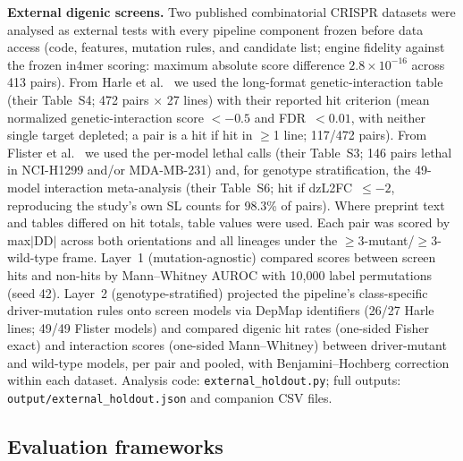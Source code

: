 \documentclass[11pt,a4paper]{article}
\begin{document}
\textbf{External digenic screens.} Two published combinatorial CRISPR datasets were analysed as external tests with every pipeline component frozen before data access (code, features, mutation rules, and candidate list; engine fidelity against the frozen in4mer scoring: maximum absolute score difference $2.8\times10^{-16}$ across 413 pairs). From Harle et al.\ \cite{Harle2025} we used the long-format genetic-interaction table (their Table~S4; 472 pairs $\times$ 27 lines) with their reported hit criterion (mean normalized genetic-interaction score $<-0.5$ and FDR~$<0.01$, with neither single target depleted; a pair is a hit if hit in $\ge$1 line; 117/472 pairs). From Flister et al.\ \cite{Flister2025} we used the per-model lethal calls (their Table~S3; 146 pairs lethal in NCI-H1299 and/or MDA-MB-231) and, for genotype stratification, the 49-model interaction meta-analysis (their Table~S6; hit if dzL2FC~$\le-2$, reproducing the study's own SL counts for 98.3\% of pairs). Where preprint text and tables differed on hit totals, table values were used. Each pair was scored by max$|$DD$|$ across both orientations and all lineages under the $\ge$3-mutant/$\ge$3-wild-type frame. Layer~1 (mutation-agnostic) compared scores between screen hits and non-hits by Mann--Whitney AUROC with 10{,}000 label permutations (seed 42). Layer~2 (genotype-stratified) projected the pipeline's class-specific driver-mutation rules onto screen models via DepMap identifiers (26/27 Harle lines; 49/49 Flister models) and compared digenic hit rates (one-sided Fisher exact) and interaction scores (one-sided Mann--Whitney) between driver-mutant and wild-type models, per pair and pooled, with Benjamini--Hochberg correction within each dataset. Analysis code: \texttt{external\_holdout.py}; full outputs: \texttt{output/external\_holdout.json} and companion CSV files.

\subsection*{Evaluation frameworks}
\end{document}
